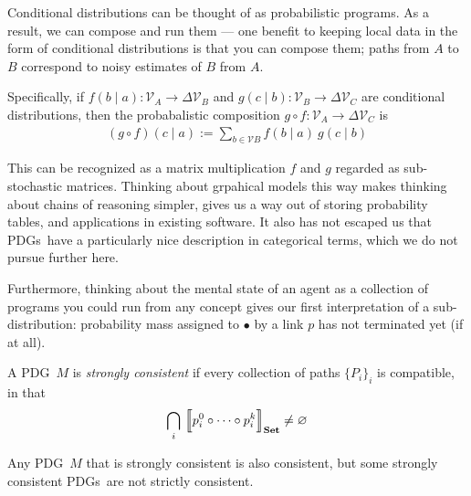 \documentclass{article}
\newcommand\Set{\textbf{Set}}
\newcommand{\MN}{PDG}
\newcommand{\MNs}{\MN s}
\begin{document}
	Conditional distributions can be thought of as probabilistic programs. As a result, we can compose and run them --- one  benefit to keeping local data in the form of conditional distributions is that you can compose them; paths from $A$ to $B$ correspond to noisy estimates of $B$ from $A$.
	
	Specifically, if $f(b \mid a) : \mathcal V_A \to \Delta \mathcal V_B$ and $g(c \mid b) : \mathcal V_B \to \Delta \mathcal V_C$ are conditional distributions, then the probabalistic composition $g\circ f : \mathcal V_A \to \Delta\mathcal V_C$ is
	\begin{align*}
			(g\circ  f) (c \mid a) :=  \sum_{b \in \mathcal V B}\!\! f (b \mid a)\ g(c \mid b)
	\end{align*}
	
	This can be recognized as a matrix multiplication $f$ and $g$ regarded as sub-stochastic matrices.
	Thinking about grpahical models this way makes thinking about chains of reasoning simpler, gives us a way out of storing probability tables, and applications in existing software. It also has not escaped us that \MNs\ have a particularly nice description in categorical terms, which we do not pursue further here.
	
	Furthermore, thinking about the mental state of an agent as a collection of programs you could run from any concept gives our first interpretation of a sub-distribution: probability mass assigned to $\bullet$ by a link $p$ has not terminated yet (if at all). 
	
	\begin{defn}
		A \MN\ $M$ is \emph{strongly consistent} if every collection of paths $\{P_i\}_i$ is compatible, in that 
		$$\bigcap_i\ \bbr*{\vphantom{\Big|}p_i^0\circ \cdots\circ p_i^k}_\Set \neq \varnothing$$
	\end{defn}

	\begin{prop}
		Any \MN\ $M$ that is strongly consistent is also consistent, but some strongly consistent \MNs\ are not strictly consistent.
	\end{prop}

	
	
\end{document}
